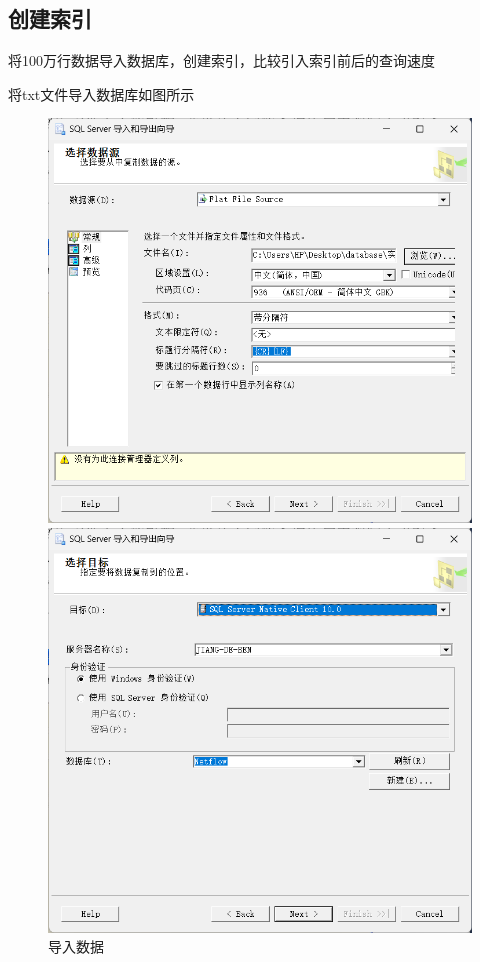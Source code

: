 \documentclass[UTF8,12pt]{article}
\begin{document}
\newpage

\subsection{创建索引}
将100万行数据导入数据库，创建索引，比较引入索引前后的查询速度

将txt文件导入数据库如图所示
\begin{figure}[htbp]
	\centering
	\begin{minipage}{0.49\linewidth}
		\centering
		\includegraphics[width=0.9\linewidth]{img/7.png}
	\end{minipage}
	\begin{minipage}{0.49\linewidth}
		\centering
		\includegraphics[width=0.9\linewidth]{img/8.png}
	\end{minipage}
    \caption{导入数据}
\end{figure}
\end{document}
